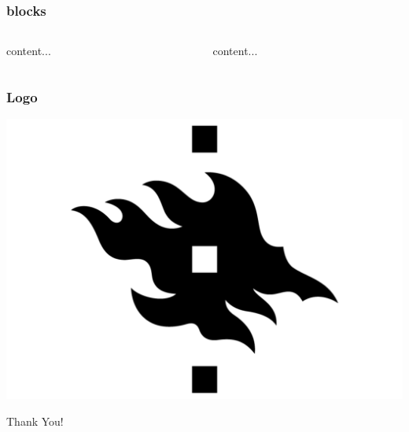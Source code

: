 \documentclass[aspectratio=169]{beamer}
\begin{document}

\begin{frame}
\frametitle{blocks}

    \begin{columns}
        \begin{column}{.4\textwidth}
            content...
        \end{column}
        \begin{column}{.4\textwidth}
            content...
        \end{column}
    \end{columns}

\end{frame}


\begin{frame}
    \frametitle{Logo}
    \begin{center}
        \includegraphics[width=0.5\paperwidth]{graphics/logo-uh}
    \end{center}
\end{frame}


\begin{frame}
    \begin{center}
        \Huge Thank You!
    \end{center}
\end{frame}
\end{document}
